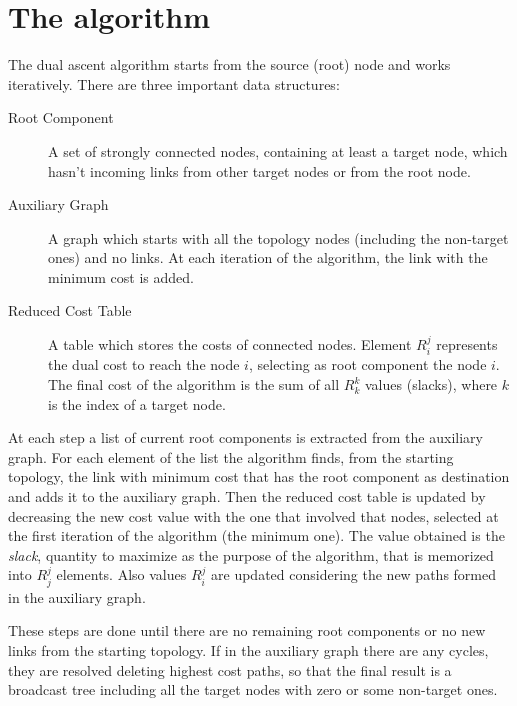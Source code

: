 \section{The algorithm}\label{sec:algorithm}

The dual ascent algorithm starts from the source (root) node and works
iteratively. There are three important data structures:

\begin{description}
	\item[Root Component] A set of strongly connected nodes, containing at
		least a target node, which hasn't incoming links from other
		target nodes or from the root node.
	\item[Auxiliary Graph] A graph which starts with all the topology nodes
		(including the non-target ones) and no links. At each iteration
		of the algorithm, the link with the minimum cost is added.
	\item[Reduced Cost Table] A table which stores the costs of connected
		nodes. Element \(R_i^j\) represents the dual cost to reach the
		node \(i\), selecting as root component the node \(i\). The
		final cost of the algorithm is the sum of all \(R_k^k\) values
		(slacks), where \(k\) is the index of a target node.
\end{description}

At each step a list of current root components is extracted from the auxiliary
graph. For each element of the list the algorithm finds, from the starting
topology, the link with minimum cost that has the root component as destination
and adds it to the auxiliary graph. Then the reduced cost table is updated by
decreasing the new cost value with the one that involved that nodes, selected at
the first iteration of the algorithm (the minimum one). The value obtained is
the \emph{slack}, quantity to maximize as the purpose of the algorithm, that is
memorized into \(R_j^j\) elements. Also values \(R_i^j\) are updated
considering the new paths formed in the auxiliary graph.

These steps are done until there are no remaining root components or no new
links from the starting topology. If in the auxiliary graph there are any
cycles, they are resolved deleting highest cost paths, so that the final result
is a broadcast tree including all the target nodes with zero or some non-target
ones.
